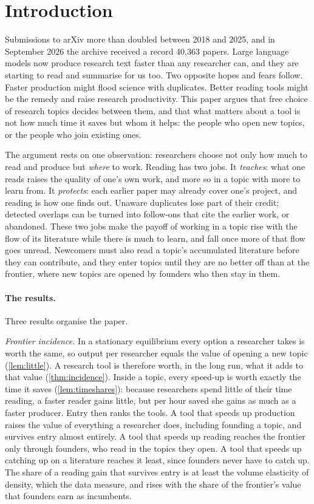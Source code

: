 \section{Introduction}\label{sec:intro}

Submissions to arXiv more than doubled between 2018 and 2025, and in September
2026 the archive received a record 40,363 papers. Large language models now
produce research text faster than any researcher can, and they are starting to
read and summarise for us too. Two opposite hopes and fears follow. Faster
production might flood science with duplicates. Better reading tools might be
the remedy and raise research productivity. This paper argues that free choice
of research topics decides between them, and that what matters about a tool is
not how much time it saves but whom it helps: the people who open new topics,
or the people who join existing ones.

The argument rests on one observation: researchers choose not only how much to
read and produce but \emph{where} to work. Reading has two jobs. It
\emph{teaches}: what one reads raises the quality of one's own work, and more so
in a topic with more to learn from. It \emph{protects}: each earlier paper may
already cover one's project, and reading is how one finds out. Unaware
duplicates lose part of their credit; detected overlaps can be turned into
follow-ons that cite the earlier work, or abandoned. These two jobs make the
payoff of working in a topic rise with the flow of its literature while there is
much to learn, and fall once more of that flow goes unread. Newcomers must also
read a topic's accumulated literature before they can contribute, and they
enter topics until they are no better off than at the frontier, where new
topics are opened by founders who then stay in them.

\paragraph{The results.} Three results organise the paper.

\emph{Frontier incidence.} In a stationary equilibrium every option a
researcher takes is worth the same, so output per researcher equals the value
of opening a new topic (\cref{lem:little}). A research tool is therefore worth,
in the long run, what it adds to that value (\cref{thm:incidence}). Inside a
topic, every speed-up is worth exactly the time it saves (\cref{lem:timeshares}):
because researchers spend little of their time reading, a faster reader gains
little, but per hour saved she gains as much as a faster producer. Entry then
ranks the tools. A tool that speeds up production raises the value of
everything a researcher does, including founding a topic, and survives entry
almost entirely. A tool that speeds up reading reaches the frontier only
through founders, who read in the topics they open. A tool that speeds up
catching up on a literature reaches it least, since founders never have to
catch up. The share of a reading gain that survives entry is at least the
volume elasticity of density, which the data measure, and rises with the share
of the frontier's value that founders earn as incumbents.

